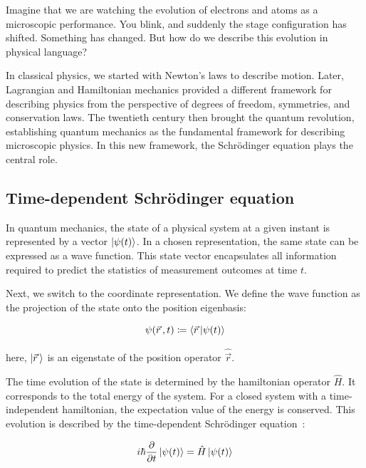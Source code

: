 Imagine that we are watching the evolution of electrons and atoms as a microscopic performance.
You blink, and suddenly the stage configuration has shifted.
Something has changed. But how do we describe this evolution in physical language?

In classical physics, we started with Newton's laws to describe motion.
Later, Lagrangian and Hamiltonian mechanics provided a different framework for describing physics from the perspective of degrees of freedom, symmetries, and conservation laws.
The twentieth century then brought the quantum revolution, establishing quantum mechanics as the fundamental framework for describing microscopic physics.
In this new framework, the Schrödinger equation plays the central role.

\subsection{Time-dependent Schrödinger equation}

In quantum mechanics, the state of a physical system at a given instant is represented by a vector $\ket{\psi(t)}$.
In a chosen representation, the same state can be expressed as a wave function.
This state vector encapsulates all information required to predict the statistics of measurement outcomes at time $t$.

Next, we switch to the coordinate representation.
We define the wave function as the projection of the state onto the position eigenbasis:

\begin{equation}
    \psi(\vec{r}\,,t)\coloneqq \braket{\vec{r}\,|\psi(t)}
\label{coordinate_representation_definition}
\end{equation}

here, $\ket{\vec{r}\,}$ is an eigenstate of the position operator $\hat{\vec{r}}$.

The time evolution of the state is determined by the hamiltonian operator $\hat{H}$.
It corresponds to the total energy of the system.
For a closed system with a time-independent hamiltonian, the expectation value of the energy is conserved. This evolution is described by the time-dependent Schrödinger equation~\cite{shankar2012principles}:

\begin{equation}
    i\hbar\frac{\partial}{\partial t}\ket{\psi(t)}=\hat{H}\ket{\psi(t)}
\label{time-dependent_Schrodinger_equation}
\end{equation}

